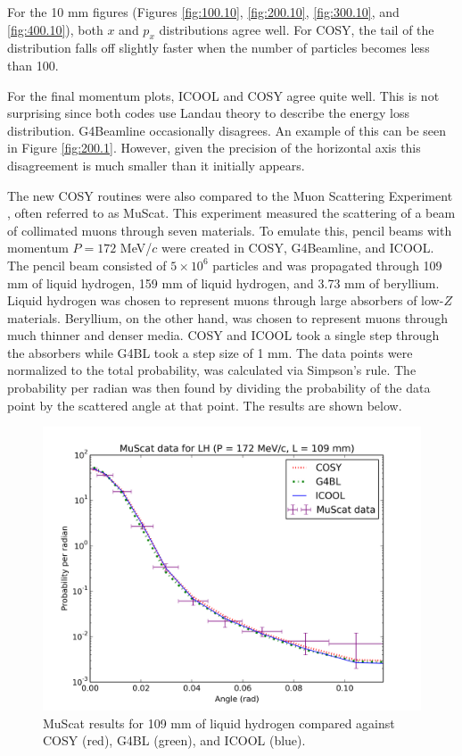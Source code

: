 For the 10 mm figures (Figures \ref{fig:100.10}, \ref{fig:200.10}, \ref{fig:300.10}, and \ref{fig:400.10}), both $x$ and $p_x$ distributions agree well. For COSY, the tail of the distribution falls off slightly faster when the number of particles becomes less than 100. 

For the final momentum plots, ICOOL and COSY agree quite well. This is not surprising since both codes use Landau theory to describe the energy loss distribution. G4Beamline occasionally disagrees. An example of this can be seen in Figure \ref{fig:200.1}. However, given the precision of the horizontal axis this disagreement is much smaller than it initially appears.

\label{sec:validation}

The new COSY routines were also compared to the Muon Scattering Experiment \cite{muscat}, often referred to as MuScat. This experiment measured the scattering of a beam of collimated muons through seven materials. To emulate this, pencil beams with momentum $P=172$ MeV/$c$ were created in COSY, G4Beamline, and ICOOL. The pencil beam consisted of $5\times10^6$ particles and was propagated through 109 mm of liquid hydrogen, 159 mm of liquid hydrogen, and 3.73 mm of beryllium. Liquid hydrogen was chosen to represent muons through large absorbers of low-$Z$ materials. Beryllium, on the other hand, was chosen to represent muons through much thinner and denser media. COSY and ICOOL took a single step through the absorbers while G4BL took a step size of 1 mm. The data points were normalized to the total probability, was calculated via Simpson's rule. The probability per radian was then found by dividing the probability of the data point by the scattered angle at that point. The results are shown below.

\begin{figure}[H]
  \centering
    \includegraphics[width=\textwidth]{Figures/172.109.muscat} 
  \caption{MuScat results for 109 mm of liquid hydrogen compared against COSY (red), G4BL (green), and ICOOL (blue).}
  \label{fig:172.109.muscat}
\end{figure}

